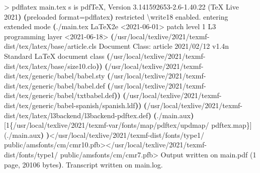 \documentclass[
  spanish,
  a4paper,
]{scrreport}
\newenvironment{Shaded}{\begin{snugshade}}{\end{snugshade}}
\newcommand{\BuiltInTok}[1]{\textcolor[rgb]{0.00,0.23,0.31}{#1}}
\newcommand{\DataTypeTok}[1]{\textcolor[rgb]{0.68,0.00,0.00}{#1}}
\newcommand{\ErrorTok}[1]{\textcolor[rgb]{0.68,0.00,0.00}{#1}}
\newcommand{\ExtensionTok}[1]{\textcolor[rgb]{0.00,0.23,0.31}{#1}}
\newcommand{\KeywordTok}[1]{\textcolor[rgb]{0.00,0.23,0.31}{\textbf{#1}}}
\newcommand{\NormalTok}[1]{\textcolor[rgb]{0.00,0.23,0.31}{#1}}
\newcommand{\OperatorTok}[1]{\textcolor[rgb]{0.37,0.37,0.37}{#1}}
\newcommand{\VariableTok}[1]{\textcolor[rgb]{0.07,0.07,0.07}{#1}}
\theoremstyle{definition}
\theoremstyle{remark}
\begin{document}
\begin{Shaded}
\begin{Highlighting}[]
\OperatorTok{\textgreater{}}\NormalTok{ pdflatex }\ExtensionTok{main.tex} 
\ExtensionTok{s}\NormalTok{ is pdfTeX, Version 3.141592653{-}2.6{-}1.40.22 }\ErrorTok{(}\ExtensionTok{TeX}\NormalTok{ Live 2021}\KeywordTok{)} \KeywordTok{(}\ExtensionTok{preloaded} 
\VariableTok{format}\OperatorTok{=}\NormalTok{pdflatex}\KeywordTok{)} \ExtensionTok{restricted} \DataTypeTok{\textbackslash{}w}\NormalTok{rite18 enabled.}
\ExtensionTok{entering}\NormalTok{ extended mode}
\KeywordTok{(}\ExtensionTok{./main.tex}
\ExtensionTok{LaTeX2e} \OperatorTok{\textless{}}\NormalTok{2021{-}06{-}01}\OperatorTok{\textgreater{}}\NormalTok{ patch level 1}
\ExtensionTok{L3}\NormalTok{ programming layer }\OperatorTok{\textless{}}\NormalTok{2021{-}06{-}18}\OperatorTok{\textgreater{}}
\KeywordTok{(}\ExtensionTok{/usr/local/texlive/2021/texmf{-}dist/tex/latex/base/article.cls}
\ExtensionTok{Document}\NormalTok{ Class: article 2021/02/12 v1.4n Standard LaTeX document class}
\KeywordTok{(}\ExtensionTok{/usr/local/texlive/2021/texmf{-}dist/tex/latex/base/size10.clo}\KeywordTok{))}
\KeywordTok{(}\ExtensionTok{/usr/local/texlive/2021/texmf{-}dist/tex/generic/babel/babel.sty}
\KeywordTok{(}\ExtensionTok{/usr/local/texlive/2021/texmf{-}dist/tex/generic/babel/babel.def}
\KeywordTok{(}\ExtensionTok{/usr/local/texlive/2021/texmf{-}dist/tex/generic/babel/txtbabel.def}\KeywordTok{))}
\KeywordTok{(}\ExtensionTok{/usr/local/texlive/2021/texmf{-}dist/tex/generic/babel{-}spanish/spanish.ldf}\KeywordTok{))}
\KeywordTok{(}\ExtensionTok{/usr/local/texlive/2021/texmf{-}dist/tex/latex/l3backend/l3backend{-}pdftex.def}\KeywordTok{)}
\KeywordTok{(}\ExtensionTok{./main.aux}\KeywordTok{)} \ExtensionTok{[1\{/usr/local/texlive/2021/texmf{-}var/fonts/map/pdftex/updmap/}
\ExtensionTok{pdftex.map\}]} \ErrorTok{(}\ExtensionTok{./main.aux}\KeywordTok{)} \KeywordTok{)}\OperatorTok{\textless{}}\NormalTok{/usr/local/texlive/2021/texmf{-}dist/fonts/type1/}
\ExtensionTok{public/amsfonts/cm/cmr10.pfb}\OperatorTok{\textgreater{}\textless{}}\NormalTok{/usr/local/texlive/2021/texmf{-}dist/fonts/type1/}
\ExtensionTok{public/amsfonts/cm/cmr7.pfb}\OperatorTok{\textgreater{}}
\ExtensionTok{Output}\NormalTok{ written on main.pdf }\ErrorTok{(}\ExtensionTok{1}\NormalTok{ page, 20106 bytes}\KeywordTok{)}\BuiltInTok{.}
\ExtensionTok{Transcript}\NormalTok{ written on main.log.}
\end{Highlighting}
\end{Shaded}
\end{document}

